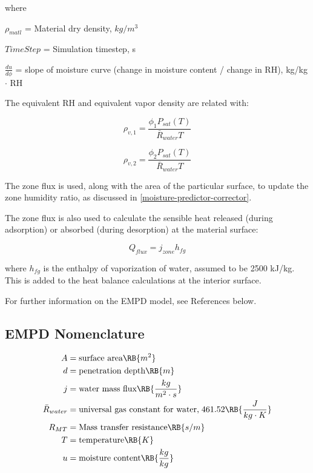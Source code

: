 where

$\rho_{matl}$ = Material dry density, $kg/m^3$

$TimeStep$ = Simulation timestep, s

$\frac {du}{d\phi}$ = slope of moisture curve (change in moisture content / change in RH), kg/kg $\cdot$ RH

The equivalent RH and equivalent vapor density are related with:

\begin{equation}
\rho_{v,1} = \frac {\phi_{1} P_{sat}(T)} {\bar R_{water} T}
\end{equation}

\begin{equation}
\rho_{v,2} = \frac {\phi_{2} P_{sat}(T)} {\bar R_{water} T}
\end{equation}

The zone flux is used, along with the area of the particular surface, to update the zone humidity ratio, as discussed in \ref{moisture-predictor-corrector}.

The zone flux is also used to calculate the sensible heat released (during adsorption) or absorbed (during desorption) at the material surface:

\begin{equation}
Q_{flux} = j_{zone} h_{fg}
\end{equation}

where \(h_{fg}\) is the enthalpy of vaporization of water, assumed to be 2500 kJ/kg. This is added to the heat balance calculations at the interior surface.

For further information on the EMPD model, see References below.

\subsection{EMPD Nomenclature}\label{empd-nomenclature}
\begin{align*}
  A  &= \text{surface area} \RB{m^{2}} \\
  d &= \text{penetration depth} \RB{m} \\
  j &= \text{water mass flux} \RB{\frac{kg}{m^{2} \cdot s}} \\
  \bar R_{water} &= \text{universal gas constant for water,} \; 461.52 \RB{\frac{J}{kg \cdot K}}   \\
  R_{MT} &= \text{Mass transfer resistance} \RB{s/m} \\
  T &= \text{temperature} \RB{K} \\
  u &= \text{moisture content} \RB{\frac{kg}{kg}}
\end{align*}

